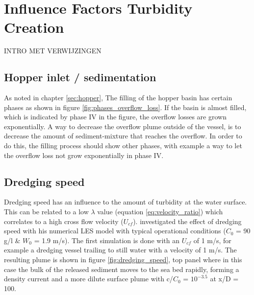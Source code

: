 \chapter{Influence Factors Turbidity Creation}
\label{CH:influence_factors}
INTRO MET VERWIJZINGEN

\newpage
\section{Hopper inlet / sedimentation}

As noted in chapter \ref{sec:hopper}, The filling of the hopper basin has certain phases as shown in figure \ref{fig:phases_overflow_loss}. If the basin is almost filled, which is indicated by phase IV in the figure, the overflow losses are grown exponentially. A way to decrease the overflow plume outside of the vessel, is to decrease the amount of sediment-mixture that reaches the overflow. In order to do this, the filling process should show other phases, with example a way to let the overflow loss not grow exponentially in phase IV.














\section{Dredging speed}
Dredging speed has an influence to the amount of turbidity at the water surface. This can be related to a low $\lambda$ value (equation \ref{eq:velocity_ratio}) which correlates to a high cross flow velocity ($U_{cf}$). \cite{Decrop} investigated the effect of dredging speed with his numerical LES model with typical operational conditions ($C_0$ =  90 g/l \& $W_0$ =  1.9 m/s). The first simulation is done with an $U_{cf}$ of 1 m/s, for example a dredging vessel trailing to still water with a velocity of 1 m/s. The resulting plume is shown in figure \ref{fig:dredging_speed}, top panel where in this case the bulk of the released sediment moves to the sea bed rapidly, forming a density current and a more dilute surface plume with c/$C_0$ =  $10^{-3.5}$ at x/D = 100.

